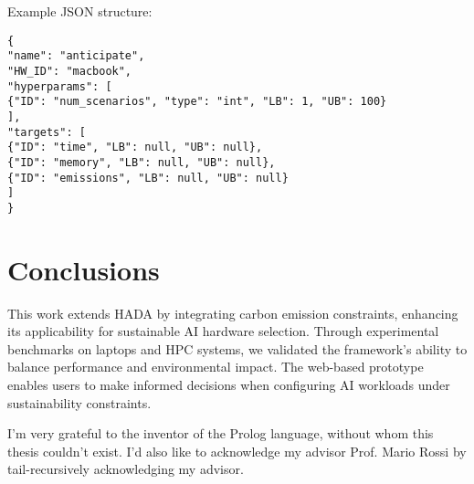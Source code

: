 \documentclass[a4paper,singleside,12pt]{report} %
\begin{document}
Example JSON structure:
\begin{verbatim}
{
"name": "anticipate",
"HW_ID": "macbook",
"hyperparams": [
{"ID": "num_scenarios", "type": "int", "LB": 1, "UB": 100}
],
"targets": [
{"ID": "time", "LB": null, "UB": null},
{"ID": "memory", "LB": null, "UB": null},
{"ID": "emissions", "LB": null, "UB": null}
]
}
\end{verbatim}

\chapter{Conclusions}

This work extends HADA by integrating carbon emission constraints, enhancing its applicability 
for sustainable AI hardware selection. Through experimental benchmarks on laptops and HPC systems, 
we validated the framework’s ability to balance performance and environmental impact. The web-based prototype 
enables users to make informed decisions when configuring AI workloads under sustainability constraints.

\appendix

\printbibliography[heading=bibintoc] %

\acknowledgements
I'm very grateful to the inventor of the Prolog language, without whom this thesis couldn't exist. I'd also like 
to acknowledge my advisor Prof. Mario Rossi by tail-recursively acknowledging my advisor.
	
\end{document}
